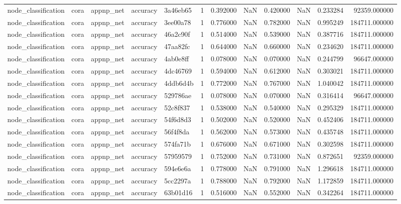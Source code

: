 \begin{tabular}{lllllrrrrrrr}
node_classification & cora & appnp_net & accuracy & 3a46eb65 & 1 & 0.392000 & NaN & 0.420000 & NaN & 0.233284 & 92359.000000 \\
node_classification & cora & appnp_net & accuracy & 3ee00a78 & 1 & 0.776000 & NaN & 0.782000 & NaN & 0.995249 & 184711.000000 \\
node_classification & cora & appnp_net & accuracy & 46a2c90f & 1 & 0.514000 & NaN & 0.539000 & NaN & 0.387716 & 184711.000000 \\
node_classification & cora & appnp_net & accuracy & 47aa82fc & 1 & 0.644000 & NaN & 0.660000 & NaN & 0.234620 & 184711.000000 \\
node_classification & cora & appnp_net & accuracy & 4ab0e8ff & 1 & 0.078000 & NaN & 0.070000 & NaN & 0.244799 & 96647.000000 \\
node_classification & cora & appnp_net & accuracy & 4dc46769 & 1 & 0.594000 & NaN & 0.612000 & NaN & 0.303021 & 184711.000000 \\
node_classification & cora & appnp_net & accuracy & 4ddb6d4b & 1 & 0.772000 & NaN & 0.767000 & NaN & 1.040042 & 184711.000000 \\
node_classification & cora & appnp_net & accuracy & 529786ae & 1 & 0.078000 & NaN & 0.070000 & NaN & 0.316414 & 96647.000000 \\
node_classification & cora & appnp_net & accuracy & 52c8f837 & 1 & 0.538000 & NaN & 0.540000 & NaN & 0.295329 & 184711.000000 \\
node_classification & cora & appnp_net & accuracy & 54f6d8d3 & 1 & 0.502000 & NaN & 0.520000 & NaN & 0.452406 & 184711.000000 \\
node_classification & cora & appnp_net & accuracy & 56f4f8da & 1 & 0.562000 & NaN & 0.573000 & NaN & 0.435748 & 184711.000000 \\
node_classification & cora & appnp_net & accuracy & 574fa71b & 1 & 0.676000 & NaN & 0.671000 & NaN & 0.302598 & 184711.000000 \\
node_classification & cora & appnp_net & accuracy & 57959579 & 1 & 0.752000 & NaN & 0.731000 & NaN & 0.872651 & 92359.000000 \\
node_classification & cora & appnp_net & accuracy & 594e6e6a & 1 & 0.778000 & NaN & 0.791000 & NaN & 1.296618 & 184711.000000 \\
node_classification & cora & appnp_net & accuracy & 5cc2297a & 1 & 0.788000 & NaN & 0.792000 & NaN & 1.172859 & 184711.000000 \\
node_classification & cora & appnp_net & accuracy & 63b01d16 & 1 & 0.516000 & NaN & 0.552000 & NaN & 0.342264 & 184711.000000 \\

\end{tabular}
